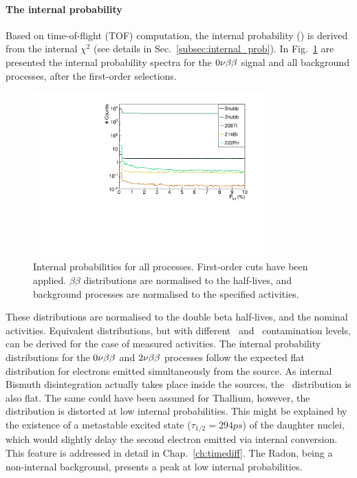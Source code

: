 \paragraph{The internal probability}
Based on time-of-flight (TOF) computation, the internal probability (\Pint) is derived from the internal $\chi^{2}$ (see details in Sec.~\ref{subsec:internal_prob}).
In Fig.~\ref{fig:Pint} are presented the internal probability spectra for the $0\nu\beta\beta$ signal and all background processes, after the first-order selections.
\begin{figure}[h]
  \centering
  \includegraphics[width=0.8\textwidth]{Sensitivity/fig_sensitivity/InternalProbability.pdf}
  \caption{Internal probabilities for all processes.
    First-order cuts have been applied.
    $\beta\beta$ distributions are normalised to the half-lives, and background processes are normalised to the specified activities.
    \label{fig:Pint}}
\end{figure}
These distributions are normalised to the double beta half-lives, and the nominal activities.
Equivalent distributions, but with different \Bi\ and \Tl\ contamination levels, can be derived for the case of measured activities.
The internal probability distributions for the $0\nu\beta\beta$ and $2\nu\beta\beta$ processes follow the expected flat distribution for electrons emitted simultaneously from the source.
As internal Bismuth disintegration actually takes place inside the sources, the \Bi\ distribution is also flat.
The same could have been assumed for Thallium, however, the distribution is distorted at low internal probabilities.
This might be explained by the existence of a metastable excited state ($\tau_{1/2} = 294 ps$) of the daughter nuclei, which would slightly delay the second electron emitted via internal conversion.
This feature is addressed in detail in Chap.~\ref{ch:timediff}.
The Radon, being a non-internal background, presents a peak at low internal probabilities.

